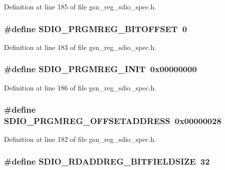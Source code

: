 Definition at line 185 of file gsn\_\-reg\_\-sdio\_\-spec.h.

\hypertarget{a00571_a1d6a0832f98e8cf6ee6e92461b2a02a9}{
\subsubsection[{SDIO\_\-PRGMREG\_\-BITOFFSET}]{\setlength{\rightskip}{0pt plus 5cm}\#define SDIO\_\-PRGMREG\_\-BITOFFSET~0}}
\label{a00571_a1d6a0832f98e8cf6ee6e92461b2a02a9}


Definition at line 183 of file gsn\_\-reg\_\-sdio\_\-spec.h.

\hypertarget{a00571_a4fd22f40b66fad965293780c3cae885f}{
\subsubsection[{SDIO\_\-PRGMREG\_\-INIT}]{\setlength{\rightskip}{0pt plus 5cm}\#define SDIO\_\-PRGMREG\_\-INIT~0x00000000}}
\label{a00571_a4fd22f40b66fad965293780c3cae885f}


Definition at line 186 of file gsn\_\-reg\_\-sdio\_\-spec.h.

\hypertarget{a00571_ab06b4fb8478f7fc59049a1da81903807}{
\subsubsection[{SDIO\_\-PRGMREG\_\-OFFSETADDRESS}]{\setlength{\rightskip}{0pt plus 5cm}\#define SDIO\_\-PRGMREG\_\-OFFSETADDRESS~0x00000028}}
\label{a00571_ab06b4fb8478f7fc59049a1da81903807}


Definition at line 182 of file gsn\_\-reg\_\-sdio\_\-spec.h.

\hypertarget{a00571_aa910bee36cd15dbdb4dc1dea5d3a54f5}{
\subsubsection[{SDIO\_\-RDADDREG\_\-BITFIELDSIZE}]{\setlength{\rightskip}{0pt plus 5cm}\#define SDIO\_\-RDADDREG\_\-BITFIELDSIZE~32}}
\label{a00571_aa910bee36cd15dbdb4dc1dea5d3a54f5}



